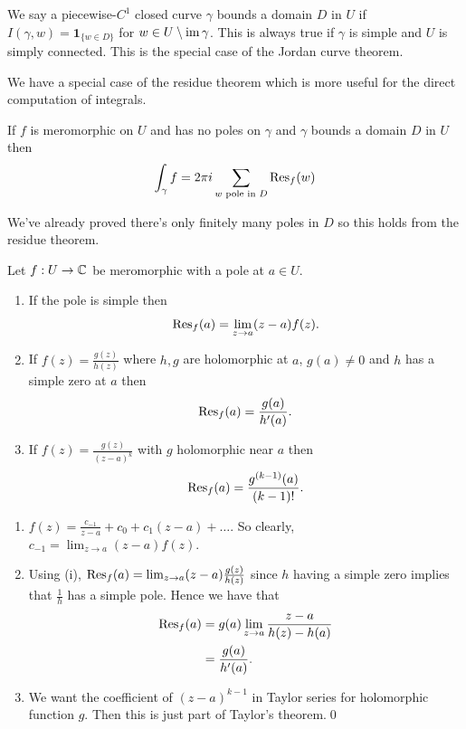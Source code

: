 \documentclass{article}
\begin{document}
\begin{remark}
	We say a piecewise-$ C^1 $ closed curve $ \gamma $ bounds a domain $ D $ in $ U $ if $ I(\gamma,w)=\mathbf 1_{\{w\in D\}} $ for $ w\in U\setminus \operatorname{im} \gamma $. This is always true if $ \gamma $ is simple and $ U $ is simply connected. This is the special case of the Jordan curve theorem.
\end{remark}
We have a special case of the residue theorem which is more useful for the direct computation of integrals.
\begin{corollary}
  If $ f $ is meromorphic on $ U $ and has no poles on $ \gamma $ and $ \gamma  $ bounds a domain $ D $ in $ U $ then
  \[
	  \int_\gamma f = 2\pi i \sum_{w \text{ pole in } D} \Res_f(w)
  \]
\end{corollary}
We've already proved there's only finitely many poles in $ D $ so this holds from the residue theorem.
\begin{lemma}
  Let $ f:U\to \mathbb{C} $ be meromorphic with a pole at $ a\in U $.
  \begin{enumerate}
	  \item If the pole is simple then
		  \[
			  \Res_f(a) = \lim_{z\to a} (z-a) f(z).
		  \]
	  \item If $ f(z) = \frac{g(z)}{h(z)} $ where $ h,g $ are holomorphic at $ a $, $ g(a)\ne 0 $ and $ h $ has a simple zero at $ a $ then
		  \[
			  \Res_f(a) = \frac{g(a)}{h'(a)}.
		  \]
	  \item If $ f(z) = \frac{g(z)}{(z-a)^k} $ with $ g $ holomorphic near $ a $ then
		  \[
			  \Res_f(a) = \frac{g^{(k-1)}(a)}{(k-1)!}.
		  \]
  \end{enumerate}
\end{lemma}
\pf
\begin{enumerate}
	\item $ f(z) = \frac{c_{-1}}{z-a} + c_0 + c_1(z-a) + \dots $. So clearly, $ c_{-1} = \lim_{z\to a}(z-a)f(z) $.
	\item Using (i), $ \Res_f(a) = \lim_{z\to a} (z-a)\frac{g(z)}{h(z)} $ since $ h $ having a simple zero implies that $ \frac 1h $ has a simple pole. Hence we have that
		\begin{align*}
			\Res_f(a) & = g(a) \lim_{z\to a} \frac{z-a}{h(z)-h(a)} \\
				  &= \frac{g(a)}{h'(a)}.
		\end{align*}
	\item We want the coefficient of $ (z-a)^{k-1} $ in Taylor series for holomorphic function $ g $. Then this is just part of Taylor's theorem.\qed
\end{enumerate}
\end{document}
